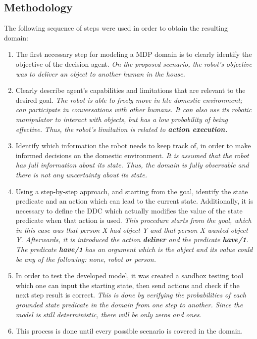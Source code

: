\subsection{Methodology}
The following sequence of steps were used in order to obtain the resulting domain:
\begin{enumerate}
  \item The first necessary step for modeling a \gls{MDP} domain is to clearly
  identify the objective of the decision agent.
  \textit{On the proposed scenario, the robot's objective was to deliver an 
  object to another human in the house.}
  \item Clearly describe agent's capabilities and limitations that are relevant to 
  the desired goal.
  \textit{The robot is able to freely move in hte domestic environment; can
  participate in conversations with other humans. It can also use its robotic 
  manipulator to interact with objects, but has a low probability of being 
  effective. Thus, the robot's limitation is related to \textbf{action execution.}}
  \item Identify which information the robot needs to keep track of, in order to make
  informed decisions on the domestic environment.
  \textit{It is assumed that the robot has full information about its state. Thus, 
  the domain is fully observable and there is not any uncertainty about its state.}
  \item Using a step-by-step approach, and starting from the goal, identify the state 
  predicate and an action which can lead to the current state. Additionally, it is 
  necessary to define the \gls{DDC} which actually modifies the value of the state 
  predicate when that action is used.
  \textit{This procedure starts from the goal, which in this case was that person X 
  had object Y and that person X wanted object Y. Afterwards, it is introduced the action
  \textbf{deliver} and the predicate \textbf{have/1}. The predicate \textbf{have/1} has 
  an argument which is the object and its value could be any of the following: none, robot
  or person.} 
  \item In order to test the developed model, it was created a sandbox testing tool 
  which one can input the starting state, then send actions and check if the next step result is 
  correct. 
  \textit{This is done by verifying the probabilities of each grounded state predicate 
  in the domain from one step to another. Since the model is still deterministic, 
  there will be only zeros and ones.}
  \item This process is done until every possible scenario is covered in the domain.

\end{enumerate}
